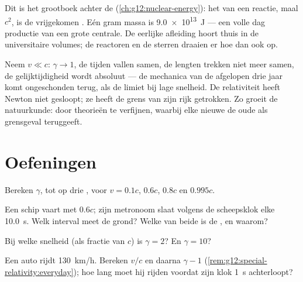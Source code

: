 \begin{remark}\label{rem:g12:special-relativity:emc2seen}
Dit is het grootboek achter de 
(\cref{ch:g12:nuclear-energy}): het  van een reactie, maal $c^2$, is
de vrijgekomen . Eén gram massa is \qty{9.0e13}{J} --- een volle dag
productie van een grote centrale. De eerlijke afleiding hoort thuis in de
universitaire volumes; de reactoren en de sterren draaien er hoe dan ook op.
\end{remark}

\begin{remark}\label{rem:g12:special-relativity:newton}
Neem $v \ll c$: $\gamma \to 1$, de tijden vallen samen, de lengten trekken niet
meer samen, de gelijktijdigheid wordt absoluut --- de mechanica van de
afgelopen drie jaar komt ongeschonden terug, als de limiet bij lage snelheid.
De relativiteit heeft Newton niet gesloopt; ze heeft de grens van zijn rijk
getrokken. Zo groeit de natuurkunde: door theorieën te verfijnen, waarbij elke
nieuwe de oude als grensgeval teruggeeft.
\end{remark}

\section{Oefeningen}

\begin{exercise}[$\star$]\label{exo:g12:special-relativity:1}
Bereken $\gamma$, tot op drie , voor $v = 0.1c$, $0.6c$,
$0.8c$ en $0.995c$.
\end{exercise}

\begin{exercise}[$\star$]\label{exo:g12:special-relativity:2}
Een schip vaart met $0.6c$; zijn metronoom slaat volgens de scheepsklok elke
\qty{10.0}{s}. Welk interval meet de grond? Welke van beide is de , en
waarom?
\end{exercise}

\begin{exercise}[$\star$]\label{exo:g12:special-relativity:3}
Bij welke snelheid (als fractie van $c$) is $\gamma = 2$? En $\gamma = 10$?
\end{exercise}

\begin{exercise}[$\star$]\label{exo:g12:special-relativity:4}
Een auto rijdt \qty{130}{km/h}. Bereken $v/c$ en daarna $\gamma - 1$
(\cref{rem:g12:special-relativity:everyday}); hoe lang moet hij rijden voordat
zijn klok \qty{1}{s} achterloopt?
\end{exercise}

